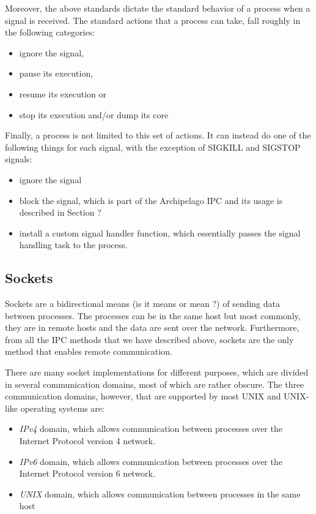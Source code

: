 Moreover, the above standards dictate the standard behavior of a process when a 
signal is received. The standard actions that a process can take, fall roughly 
in the following categories:

\begin{itemize}
	\item ignore the signal,
	\item pause its execution,
	\item resume its execution or
	\item stop its execution and/or dump its core
\end{itemize}

Finally, a process is not limited to this set of actions. It can instead do one 
of the following things for each signal, with the exception of SIGKILL and 
SIGSTOP signals:

\begin{itemize}
	\item ignore the signal
	\item block the signal, which is part of the Archipelago IPC and its 
		usage is described in Section ?
	\item install a custom signal handler function, which essentially 
		passes the signal handling task to the process.
\end{itemize}

\subsection{Sockets}

Sockets are a bidirectional means \fixme(is it means or mean ?) of sending data 
between processes.  The processes can be in the same host but most commonly, 
they are in remote hosts and the data are sent over the network. Furthermore, 
from all the IPC methods that we have described above, sockets are the only 
method that enables remote communication. 

There are many socket implementations for different purposes, which are divided 
in several communication domains, most of which are rather obscure. The three 
communication domains, however, that are supported by most UNIX and UNIX-like 
operating systems are:

\begin{itemize}
	\item \textit{IPv4} domain, which allows communication between 
		processes over the Internet Protocol version 4 network.
	\item \textit{IPv6} domain, which allows communication between 
		processes over the Internet Protocol version 6 network.
	\item \textit{UNIX} domain, which allows communication between 
		processes in the same host
\end{itemize}

